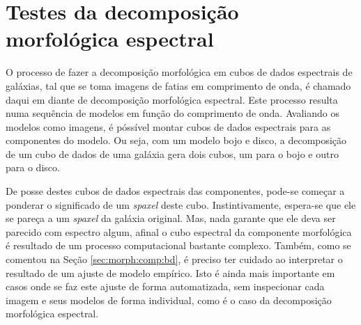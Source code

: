 


\chapter{Testes da decomposição morfológica espectral}
\label{sec:test}

O processo de fazer a decomposição morfológica em cubos de dados espectrais de
galáxias, tal que se toma imagens de fatias em comprimento de onda, é chamado
daqui em diante de decomposição morfológica espectral. Este processo resulta
numa sequência de modelos em função do comprimento de onda. Avaliando os modelos
como imagens, é póssível montar cubos de dados espectrais para as componentes do
modelo. Ou seja, com um modelo bojo e disco, a decomposição de um cubo de dados
de uma galáxia gera dois cubos, um para o bojo e outro para o disco.

De posse destes cubos de dados espectrais das componentes, pode-se começar a
ponderar o significado de um {\em spaxel} deste cubo. Instintivamente, espera-se
que ele se pareça a um {\em spaxel} da galáxia original. Mas, nada garante que
ele deva ser parecido com espectro algum, afinal o cubo espectral da componente
morfológica é resultado de um processo computacional bastante complexo.
Também, como se comentou na Seção \ref{sec:morph:comp:bd}, é preciso ter cuidado
ao interpretar o resultado de um ajuste de modelo empírico.
Isto é ainda mais importante em casos onde se faz este ajuste de forma
automatizada, sem inspecionar cada imagem e seus modelos de forma individual,
como é o caso da decomposição morfológica espectral.

